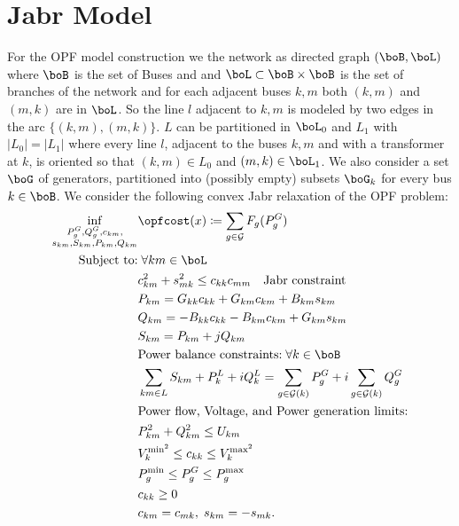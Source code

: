 \documentclass{article}
\begin{document}
\section{Jabr Model}



For the OPF model construction we the network as directed graph
$(\boB,\boL)$ where $\boB$ is the set of Buses and and $\boL \subset \boB \times \boB$ is the 
set of branches of the network and for each adjacent buses $k,m$ both $(k,m)$ and $(m,k)$ are
in $\boL$. So the line $l$ adjacent to $k,m$ is modeled by two edges in the arc $\{(k,m),(m,k)\}$.
$L$ can be partitioned in $\boL_0$ and $L_1$ with $|L_0|=|L_1|$ where every line $l$, adjacent 
to the buses $k,m$ and with a transformer at $k$, is oriented so that $(k,m) \in L_0$ and 
$(m,k) \in \boL_1$. We also consider a set $\boG$ of generators, partitioned into 
(possibly empty) subsets $\boG_k$ for every bus $k \in \boB$.
We consider the following convex Jabr relaxation of the OPF problem:
\begin{align}
  \label{Jabr equality model}
  \inf_{\substack{P^G_g, Q^G_g, c_{km}, \\ s_{km}, S_{km}, P_{km}, Q_{km}}} & \opfcost(x) \coloneqq \sum_{g \in \mathcal{G}}{F_g(P_g^G)} \\
  \text{Subject to:} & \; \forall km \in \boL \nonumber \\
  & c_{km}^2 + s_{mk}^2 \leq c_{kk}c_{mm} \quad \text{Jabr constraint} \label{Jabr constraint}\\
  & P_{km} = G_{kk}c_{kk}+G_{km}c_{km}+B_{km}s_{km} \label{c to P} \\
  & Q_{km} = -B_{kk}c_{kk}-B_{km}c_{km}+G_{km}s_{km} \label{c to Q}\\
  & S_{km} = P_{km} + jQ_{km} \label{PQ to S}\\
  & \text{Power balance constraints:}\; \forall k \in \boB\nonumber \\
  & \sum_{km \in L}S_{km}+P_k^L+iQ_k^L = \sum_{g \in \mathcal{G}(k)}{P_g^G} + i\sum_{g \in \mathcal{G}(k)}{Q_g^G} \label{constr: Power Flow Constraint J}\\
  & \text{Power flow, Voltage, and Power generation limits:} \nonumber \\
  & P_{km}^2 + Q_{km}^2 \leq U_{km} \label{Power Flow Magnitude Constraint J}\\
  & V_k^{\text{min}^2} \leq c_{kk} \leq V_k^{\text{max}^2} \label{Voltage Magnitude Constraint J} \\
  & P_g^{\text{min}} \leq P_g^G \leq P_g^{\text{max}}\label{Power generation Magnitude Constraint J} \\
  & c_{kk} \geq 0 \; \\ 
  & c_{km} = c_{mk}, \;s_{km} = - s_{mk}.
\end{align}
\end{document}

